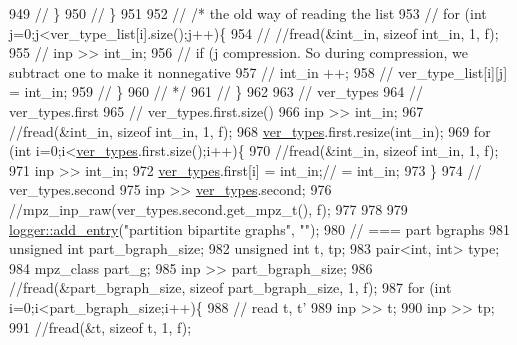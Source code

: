 \begin{DoxyCode}
949   \textcolor{comment}{//     \}}
950   \textcolor{comment}{//   \}}
951 
952   \textcolor{comment}{//   /* the old way of reading the list}
953   \textcolor{comment}{//   for (int j=0;j<ver\_type\_list[i].size();j++)\{}
954   \textcolor{comment}{//     //fread(&int\_in, sizeof int\_in, 1, f);}
955   \textcolor{comment}{//     inp >> int\_in;}
956   \textcolor{comment}{//     if (j%
       compression. So during compression, we subtract one to make it nonnegative}
957   \textcolor{comment}{//       int\_in ++;}
958   \textcolor{comment}{//     ver\_type\_list[i][j] = int\_in;}
959   \textcolor{comment}{//   \}}
960   \textcolor{comment}{//   */}
961   \textcolor{comment}{// \}}
962 
963   \textcolor{comment}{// ver\_types}
964   \textcolor{comment}{// ver\_types.first}
965   \textcolor{comment}{// ver\_types.first.size()}
966   inp >> int\_in;
967   \textcolor{comment}{//fread(&int\_in, sizeof int\_in, 1, f);}
968   \hyperlink{classmarked__graph__compressed_af446cc5e23c241a92b76642fd5ebc403}{ver\_types}.first.resize(int\_in);
969   \textcolor{keywordflow}{for} (\textcolor{keywordtype}{int} i=0;i<\hyperlink{classmarked__graph__compressed_af446cc5e23c241a92b76642fd5ebc403}{ver\_types}.first.size();i++)\{
970     \textcolor{comment}{//fread(&int\_in, sizeof int\_in, 1, f);}
971     inp >> int\_in;
972     \hyperlink{classmarked__graph__compressed_af446cc5e23c241a92b76642fd5ebc403}{ver\_types}.first[i] = int\_in;\textcolor{comment}{// = int\_in;}
973   \}
974   \textcolor{comment}{// ver\_types.second}
975   inp >> \hyperlink{classmarked__graph__compressed_af446cc5e23c241a92b76642fd5ebc403}{ver\_types}.second;
976   \textcolor{comment}{//mpz\_inp\_raw(ver\_types.second.get\_mpz\_t(), f);}
977 
978 
979   \hyperlink{classlogger_a710163deb17bc81f70d53d285b8ac9ac}{logger::add\_entry}(\textcolor{stringliteral}{"partition bipartite graphs"}, \textcolor{stringliteral}{""});
980   \textcolor{comment}{// === part bgraphs}
981   \textcolor{keywordtype}{unsigned} \textcolor{keywordtype}{int} part\_bgraph\_size;
982   \textcolor{keywordtype}{unsigned} \textcolor{keywordtype}{int} t, tp;
983   pair<int, int> type; 
984   mpz\_class part\_g;
985   inp >> part\_bgraph\_size;
986   \textcolor{comment}{//fread(&part\_bgraph\_size, sizeof part\_bgraph\_size, 1, f);}
987   \textcolor{keywordflow}{for} (\textcolor{keywordtype}{int} i=0;i<part\_bgraph\_size;i++)\{
988     \textcolor{comment}{// read t, t'}
989     inp >> t;
990     inp >> tp;
991     \textcolor{comment}{//fread(&t, sizeof t, 1, f);}

\end{DoxyCode}

